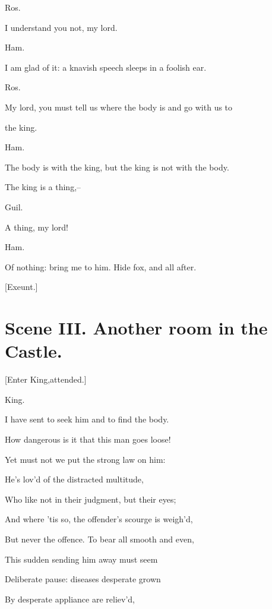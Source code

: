 \documentclass[12pt]{book}
\begin{document}
Ros.

I understand you not, my lord.



Ham.

I am glad of it: a knavish speech sleeps in a foolish ear.



Ros.

My lord, you must tell us where the body is and go with us to

the king.



Ham.

The body is with the king, but the king is not with the body.

The king is a thing,--



Guil.

A thing, my lord!



Ham.

Of nothing: bring me to him. Hide fox, and all after.



[Exeunt.]







\section*{Scene III. Another room in the Castle.}



[Enter King,attended.]



King.

I have sent to seek him and to find the body.

How dangerous is it that this man goes loose!

Yet must not we put the strong law on him:

He's lov'd of the distracted multitude,

Who like not in their judgment, but their eyes;

And where 'tis so, the offender's scourge is weigh'd,

But never the offence. To bear all smooth and even,

This sudden sending him away must seem

Deliberate pause: diseases desperate grown

By desperate appliance are reliev'd,
\end{document}
